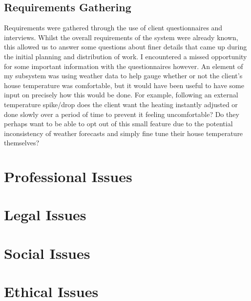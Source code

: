 \documentclass[]{report}
\begin{document}
\subsection{Requirements Gathering}
Requirements were gathered through the use of client questionnaires and interviews. Whilst the overall requirements of the system were already known, this allowed us to answer some questions about finer details that came up during the initial planning and distribution of work. I encountered a missed opportunity for some important information with the questionnaires however. An element of my subsystem was using weather data to help gauge whether or not the client's house temperature was comfortable, but it would have been useful to have some input on precisely how this would be done. For example, following an external temperature spike/drop does the client want the heating instantly adjusted or done slowly over a period of time to prevent it feeling uncomfortable? Do they perhaps want to be able to opt out of this small feature due to the potential inconsistency of weather forecasts and simply fine tune their house temperature themselves?

\section{Professional Issues}


\section{Legal Issues}


\section{Social Issues}


\section{Ethical Issues}

	
	
\end{document}
